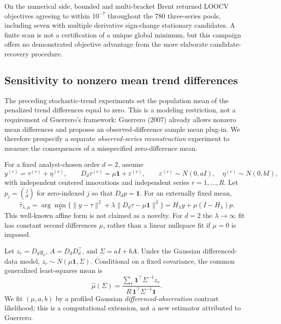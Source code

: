 \documentclass[11pt]{article}
\begin{document}
On the numerical side, bounded and multi-bracket Brent
returned LOOCV objectives agreeing to within $10^{-7}$
throughout the 780 three-series pools, including seven with
multiple derivative sign-change stationary candidates.
A finite scan is not a certification of a unique global minimum,
but this campaign offers no demonstrated objective advantage
from the more elaborate candidate-recovery procedure.

\subsection{Sensitivity to nonzero mean trend differences}

The preceding stochastic-trend experiments set the population
mean of the penalized trend differences equal to zero.
This is a modeling restriction, not a requirement of
Guerrero's framework: Guerrero (2007) already allows nonzero
mean differences and proposes an observed-difference sample
mean plug-in. We therefore prespecify a separate
\emph{observed-series reconstruction} experiment to measure
the consequences of a misspecified zero-difference mean.

For a fixed analyst-chosen order $d=2$, assume
\begin{equation}\label{eq:nonzero-mu-dgp}
 y^{(r)}=\tau^{(r)}+\eta^{(r)},\qquad
 D_d\tau^{(r)}=\mu\mathbf1+\varepsilon^{(r)},\qquad
 \varepsilon^{(r)}\sim N(0,aI),\quad
 \eta^{(r)}\sim N(0,bI),
\end{equation}
with independent centered innovations and independent
series $r=1,\ldots,R$. Let $p_j=\binom jd$ for zero-indexed $j$
so that $D_dp=\mathbf1$. For an externally fixed mean,
\begin{equation}\label{eq:nonzero-mu-affine}
 \widehat\tau_{\lambda,\mu}
 =\arg\min_{\tau}
 \{\|y-\tau\|^2+\lambda\|D_d\tau-\mu\mathbf1\|^2\}
 =H_\lambda y+\mu(I-H_\lambda)p.
\end{equation}
This well-known affine form is not claimed as a novelty.
For $d=2$ the $\lambda\to\infty$ fit has constant
second differences $\mu$, rather than a linear nullspace
fit if $\mu=0$ is imposed.

Let $z_r=D_dy_r$, $A=D_dD_d^\top$, and
$\Sigma=aI+bA$. Under the Gaussian differenced-data model,
$z_r\sim N(\mu\mathbf1,\Sigma)$. Conditional on a fixed
covariance, the common generalized least-squares mean is
\begin{equation}\label{eq:gls-mean-contrast}
 \widehat\mu(\Sigma)=
 \frac{\sum_r\mathbf1^\top\Sigma^{-1}z_r}
 {R\,\mathbf1^\top\Sigma^{-1}\mathbf1}.
\end{equation}
We fit $(\mu,a,b)$ by a profiled Gaussian
\emph{differenced-observation} contrast likelihood;
this is a computational extension, not a new estimator
attributed to Guerrero.
\end{document}
